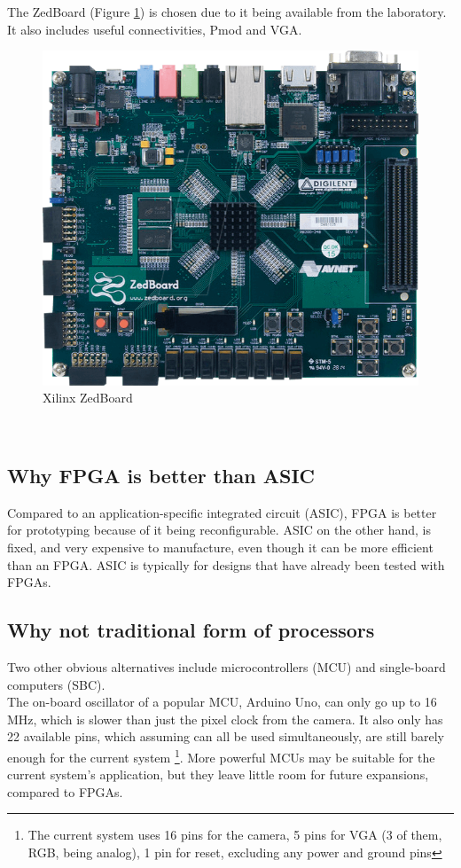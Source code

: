 \documentclass{article}
\begin{document}
	The ZedBoard (Figure \ref{fig:zedboard}) is chosen due to it being available from the laboratory. It also includes useful connectivities, Pmod and VGA.
	\begin{figure}[h]
		\centering
		\includegraphics[scale=0.6]{zedboard}
		\caption{Xilinx ZedBoard}
		\label{fig:zedboard}
	\end{figure}
	\\
	
	\subsection{Why FPGA is better than ASIC} Compared to an application-specific integrated circuit (ASIC), FPGA is better for prototyping because of it being reconfigurable. ASIC on the other hand, is fixed, and very expensive to manufacture, even though it can be more efficient than an FPGA. ASIC is typically for designs that have already been tested with FPGAs.
	\\
	
	\subsection{Why not traditional form of processors}
	Two other obvious alternatives include microcontrollers (MCU) and single-board computers (SBC).
	\\
	
	The on-board oscillator of a popular MCU, Arduino Uno, can only go up to 16 MHz, which is slower than just the pixel clock from the camera. It also only has 22 available pins, which assuming can all be used simultaneously, are still barely enough for the current system \footnote{The current system uses 16 pins for the camera, 5 pins for VGA (3 of them, RGB, being analog), 1 pin for reset, excluding any power and ground pins}. More powerful MCUs may be suitable for the current system’s application, but they leave little room for future expansions, compared to FPGAs.
	\\
	
\end{document}
